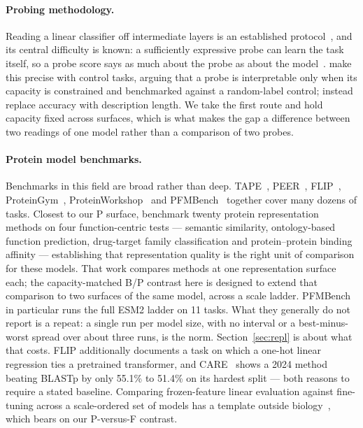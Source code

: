 \documentclass[11pt]{article}
\begin{document}
\paragraph{Probing methodology.} Reading a linear classifier off intermediate
layers is an established protocol~\citep{alain2016linear}, and its central
difficulty is known: a sufficiently expressive probe can learn the task itself, so
a probe score says as much about the probe as about the
model~\citep{belinkov2022probing}. \citet{hewitt2019control} make this precise with
control tasks, arguing that a probe is interpretable only when its capacity is
constrained and benchmarked against a random-label control; \citet{voita2020mdl}
instead replace accuracy with description length. We take the first route and hold
capacity fixed across surfaces, which is what makes the gap a difference between
two readings of one model rather than a comparison of two probes.

\paragraph{Protein model benchmarks.} Benchmarks in this field are broad rather
than deep. TAPE~\citep{rao2019tape}, PEER~\citep{xu2022peer}, FLIP~\citep{dallago2021flip},
ProteinGym~\citep{notin2023proteingym},
ProteinWorkshop~\citep{jamasb2024proteinworkshop} and
PFMBench~\citep{gao2025pfmbench} together cover many dozens of tasks. Closest to
our P surface, \citet{unsal2022probe} benchmark twenty protein representation
methods on four function-centric tests --- semantic similarity, ontology-based
function prediction, drug-target family classification and protein--protein
binding affinity --- establishing that representation quality is the right unit of
comparison for these models. That work compares methods at one representation
surface each; the capacity-matched B/P contrast here is designed to extend that
comparison to two surfaces of the same model, across a scale ladder. PFMBench in
particular runs the full ESM2 ladder on 11 tasks. What they generally do not
report is a repeat: a single run per model size, with no interval or a
best-minus-worst spread over about three runs, is the norm. Section~\ref{sec:repl}
is about what that costs. FLIP additionally documents a task on which a one-hot
linear regression ties a pretrained transformer, and CARE~\citep{yang2024care}
shows a 2024 method beating BLASTp by only 55.1\% to 51.4\% on its hardest split
--- both reasons to require a stated baseline. Comparing frozen-feature linear evaluation
against fine-tuning across a scale-ordered set of models has a template outside
biology~\citep{kornblith2019transfer}, which bears on our P-versus-F contrast.
\end{document}

